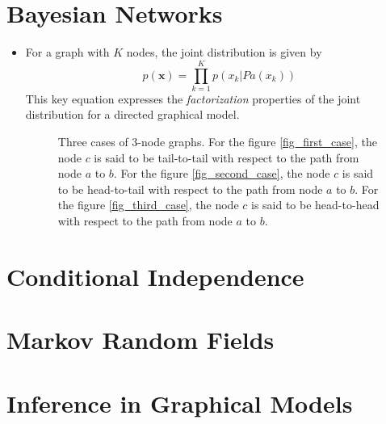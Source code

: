 \documentclass[12pt, a4paper]{article}
\begin{document}
    \section{Bayesian Networks}
    \begin{itemize}
        \item For a graph with $K$ nodes, the joint distribution is given by \begin{equation*}
            p(\bm{x})=\prod_{k=1}^Kp(x_k|Pa(x_k))
        \end{equation*}
        This key equation expresses the \textit{factorization} properties of the joint 
        distribution for a directed graphical model.
        \begin{figure}[!t]
            \centering
            \hfil
            \hfil
            \caption{Three cases of 3-node graphs. For the figure \ref{fig_first_case}, the node $c$
            is said to be tail-to-tail with respect to the path from node $a$ to $b$. 
            For the figure \ref{fig_second_case}, the node $c$
            is said to be head-to-tail with respect to the path from node $a$ to $b$.
            For the figure \ref{fig_third_case}, the node $c$
            is said to be head-to-head with respect to the path from node $a$ to $b$.}
            \label{fig:threecases}
        \end{figure}
    \end{itemize}


    \section{Conditional Independence}
    \section{Markov Random Fields}
    \section{Inference in Graphical Models}
\end{document}
